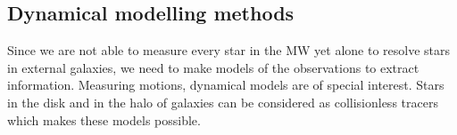\iffalse
\subsubsection{Application}
MW \acp{GC} proper motions and dynamics (including action distribution and dynamical model of potentials): \cite{Vasiliev...GCdynsGaiaDR2...2018}\\
Modelling the \ac{MW}'s \ac{GC} system: \cite{Binney...GCsystem...2017}
\fi
\subsection{Dynamical modelling methods}
Since we are not able to measure every star in the \ac{MW} yet alone to resolve stars in external galaxies, we need to make models of the observations to extract information. Measuring motions, dynamical models are of special interest. Stars in the disk and in the halo of galaxies can be considered as collisionless tracers which makes these models possible. 
